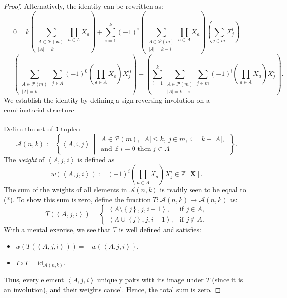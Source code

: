 \documentclass[11pt, a4paper, oneside]{article}
\theoremstyle{remark}
\theoremstyle{lemma}
\begin{document}
\begin{proof}
Alternatively, the identity can be rewritten as:
\[
0 = k\left( \sum_{\substack{A \in \mathscr{P}(m) \\ \left|A\right| = k}} \prod_{a \in A} X_{a} \right)
+ \sum_{i=1}^{k} (-1)^{i} \left( \sum_{\substack{A \in \mathscr{P}(m) \\ \left|A\right| = k-i}} \prod_{a \in A} X_{a} \right)
\left( \sum_{j \in m} X_j^{i} \right)
\]
\begin{equation}
\label{eq:star}
\tag{*}
= \left( \sum_{\substack{A \in \mathscr{P}(m) \\ \left|A\right| = k}} \sum_{j \in A} (-1)^{0}
\left( \prod_{a \in A} X_a \right) X_j^0 \right)
+ \left( \sum_{i=1}^{k} \sum_{\substack{A \in \mathscr{P}(m) \\ \left|A\right| = k-i}} \sum_{j \in m} (-1)^{i}
\left( \prod_{a \in A} X_a \right) X_j^i \right).
\end{equation}
We establish the identity by defining a sign-reversing involution on a combinatorial structure.
\\\\
Define the set of \( 3 \)-tuples:
\[
\mathcal{A}(n, k) := \left\{ \left\langle A, i, j \right\rangle \,\middle|\, 
\begin{array}{l}
A \in \mathscr{P}(m),\ |A| \leq k,\ j \in m,\ i = k - |A|,\ \\
\text{and if } i = 0 \text{ then } j \in A
\end{array}
\right\}.
\]
The \emph{weight} of \( \left\langle A, j, i \right\rangle \) is defined as:
\[
w\left( \left\langle A, j, i \right\rangle \right) := (-1)^{i} \left( \prod_{a \in A} X_a \right) X_j^i \in \mathbb{Z}[\mathbf{X}].
\]
The sum of the weights of all elements in \( \mathcal{A}(n, k) \) is readily seen to be equal to \hyperref[eq:star]{(*)}. To show this sum is zero, define the function \( T: \mathcal{A}(n, k) \to \mathcal{A}(n, k) \) as:
\[
T\left( \left\langle A, j, i \right\rangle \right) =
\begin{cases}
\left\langle A \setminus \left\{ j \right\}, j, i + 1 \right\rangle, & \text{if } j \in A, \\
\left\langle A \cup \left\{ j \right\}, j, i - 1 \right\rangle, & \text{if } j \notin A.
\end{cases}
\]
With a mental exercise, we see that \( T \) is well defined and satisfies:
\begin{itemize}
    \item \( w\left( T\left( \left\langle A, j, i \right\rangle \right) \right) = -w\left( \left\langle A, j, i \right\rangle \right) \),
    \item \( T \circ T = \mathrm{id}_{\mathcal{A}(n, k)} \).
\end{itemize}
Thus, every element \( \left\langle A, j, i \right\rangle \) uniquely pairs with its image under \( T \) (since it is an involution), and their weights cancel. Hence, the total sum is zero.
\end{proof}
\end{document}
